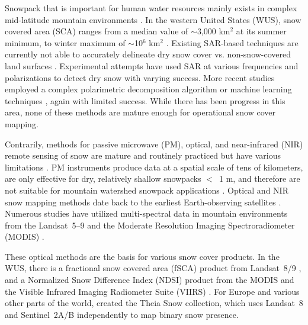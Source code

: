 Snowpack that is important for human water resources mainly exists in complex mid-latitude mountain environments \citep{barnettPotentialImpactsWarming2005}. In the western United States (WUS), snow covered area (SCA) ranges from a median value of $\sim$3,000 km$^{2}$ at its summer minimum, to winter maximum of $\sim$10$^{6}$ km$^{2}$ \citep{rittgerSnowToday2022}. Existing SAR-based techniques are currently not able to accurately delineate dry snow cover vs. non-snow-covered land surfaces \citep{tsaiRemoteSensingSnow2019}. Experimental attempts have used SAR at various frequencies and polarizations to detect dry snow \citep{rottThematicStudiesAlpine1994, shiMappingSeasonalSnow1997} with varying success. More recent studies employed a complex polarimetric decomposition algorithm \citep{varadeIdentificationSnowUsing2020} or machine learning techniques \citep{tsaiWetDrySnow2019}, again with limited success. While there has been progress in this area, none of these methods are mature enough for operational snow cover mapping. \par

Contrarily, methods for passive microwave (PM), optical, and near-infrared (NIR) remote sensing of snow are mature and routinely practiced but have various limitations \citep{nolinRecentAdvancesRemote2010,dozierMultispectralHyperspectralRemote2004,saberiReviewSnowWater2020}. PM instruments produce data at a spatial scale of tens of kilometers, are only effective for dry, relatively shallow snowpacks $<$~1 m, and therefore are not suitable for mountain watershed snowpack applications \citep{takalaEstimatingNorthernHemisphere2011,pulliainenPatternsTrendsNorthern2020}. Optical and NIR snow mapping methods date back to the earliest Earth-observing satellites \citep{rangoSatellitePotentialsSnowcover1976a}. Numerous studies have utilized multi-spectral data in mountain environments from the Landsat~5--9 \citep{dozierSpectralSignatureAlpine1989} and the Moderate Resolution Imaging Spectroradiometer (MODIS) \citep{painterRetrievalSubpixelSnowcovered2003, painterRetrievalSubpixelSnow2009, rittgerAssessmentMethodsMapping2013}. 

These optical methods are the basis for various snow cover products. In the WUS, there is a fractional snow covered area (fSCA) product from Landsat~8/9 \citep{selkowitzUSGSLandsatSnow2017}, and a Normalized Snow Difference Index (NDSI) \citep{dozierSpectralSignatureAlpine1989, hallDevelopmentMethodsMapping1995} product from the MODIS \citep{hallMODISSnowcoverProducts2002} and the Visible Infrared Imaging Radiometer Suite (VIIRS) \citep{justiceLandCryosphereProducts2013}. For Europe and various other parts of the world, \cite{gascoinTheiaSnowCollection2019a} created the Theia Snow collection, which uses Landsat~8 and Sentinel~2A/B independently to map binary snow presence.

